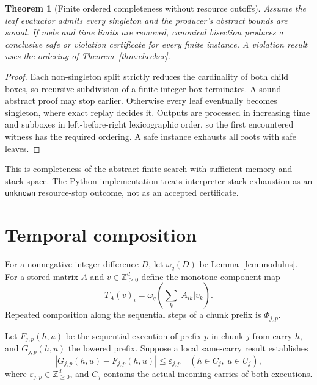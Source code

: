 \documentclass[11pt]{article}
\newtheorem{theorem}[definition]{Theorem}
\newcommand{\Z}{\mathbb Z}
\begin{document}
\begin{theorem}[Finite ordered completeness without resource cutoffs]\label{thm:complete}
Assume the leaf evaluator admits every singleton and the producer's abstract bounds are sound. If node and time limits are removed, canonical bisection produces a conclusive safe or violation certificate for every finite instance. A violation result uses the ordering of Theorem~\ref{thm:checker}.
\end{theorem}
\begin{proof}
Each non-singleton split strictly reduces the cardinality of both child boxes, so recursive subdivision of a finite integer box terminates. A sound abstract proof may stop earlier. Otherwise every leaf eventually becomes singleton, where exact replay decides it. Outputs are processed in increasing time and subboxes in left-before-right lexicographic order, so the first encountered witness has the required ordering. A safe instance exhausts all roots with safe leaves.
\end{proof}
This is completeness of the abstract finite search with sufficient memory and stack space. The Python implementation treats interpreter stack exhaustion as an \texttt{unknown} resource-stop outcome, not as an accepted certificate.

\section{Temporal composition}
For a nonnegative integer difference $D$, let $\omega_q(D)$ be Lemma~\ref{lem:modulus}. For a stored matrix $A$ and $v\in\Z_{\ge0}^d$ define the monotone component map
\[
  T_A(v)_i=\omega_q\!\left(\sum_k |A_{ik}|v_k\right).
\]
Repeated composition along the sequential steps of a chunk prefix is $\Phi_{j,p}$.

Let $F_{j,p}(h,u)$ be the sequential execution of prefix $p$ in chunk $j$ from carry $h$, and $G_{j,p}(h,u)$ the lowered prefix. Suppose a local same-carry result establishes
\[
 |G_{j,p}(h,u)-F_{j,p}(h,u)|\le\varepsilon_{j,p}
 \quad(h\in C_j,\ u\in U_j),
\]
where $\varepsilon_{j,p}\in\Z_{\ge0}^d$, and $C_j$ contains the actual incoming carries of both executions.
\end{document}
